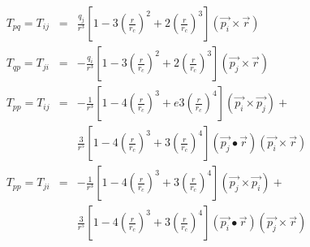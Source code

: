 \documentclass[12pt]{article}
\begin{document}
\begin{eqnarray*}
T_{pq} = T_{ij} & = & \frac{q_j}{r^3} \left[ 1 - 
  3\left(\frac{r}{r_c}\right)^{\!2} +
  2\left(\frac{r}{r_c}\right)^{\!3}\right] (\vec{p_i}\times\vec{r}) \\
T_{qp} = T_{ji} & = & - \frac{q_i}{r^3} \left[ 1 -
  3\left(\frac{r}{r_c}\right)^{\!2} +
  2\left(\frac{r}{r_c}\right)^{\!3} \right] (\vec{p_j}\times\vec{r}) \\
T_{pp} = T_{ij} & = & -\frac{1}{r^3}\left[1-4\left(\frac{r}{r_c}\right)^{\!3} +
  e3\left(\frac{r}{r_c}\right)^{\!4}\right] (\vec{p_i} \times \vec{p_j}) + \\
  & & \frac{3}{r^5}\left[1-4\left(\frac{r}{r_c}\right)^{\!3} +
  3\left(\frac{r}{r_c}\right)^{\!4}\right] (\vec{p_j}\bullet\vec{r})
  (\vec{p_i} \times \vec{r}) \\
T_{pp} = T_{ji} & = & -\frac{1}{r^3}\left[1-4\left(\frac{r}{r_c}\right)^{\!3} +
  3\left(\frac{r}{r_c}\right)^{\!4}\right](\vec{p_j} \times \vec{p_i}) + \\
  & & \frac{3}{r^5}\left[1-4\left(\frac{r}{r_c}\right)^{\!3} +
  3\left(\frac{r}{r_c}\right)^{\!4}\right] (\vec{p_i} \bullet \vec{r}) 
  (\vec{p_j} \times \vec{r}) \\
\end{eqnarray*}                           
\end{document}
